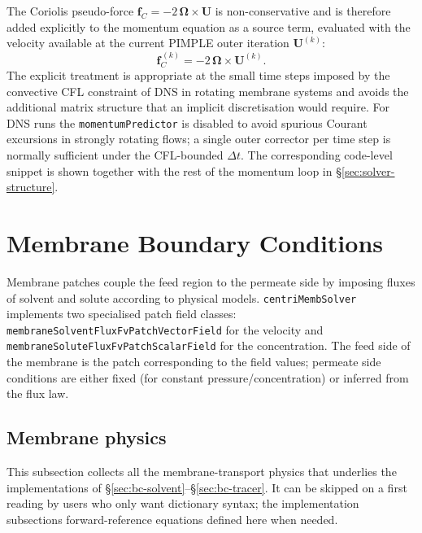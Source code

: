 \documentclass[11pt,a4paper]{article}
\begin{document}
The Coriolis pseudo-force \(\mathbf{f}_{C} = -2\,\boldsymbol{\Omega}\times\mathbf{U}\)
is non-conservative and is therefore added explicitly to the momentum
equation as a source term, evaluated with the velocity available at
the current PIMPLE outer iteration
\(\mathbf{U}^{(k)}\):
\begin{equation}
	\mathbf{f}_{C}^{\,(k)} = -2\,\boldsymbol{\Omega}\times\mathbf{U}^{(k)} .
	\label{eq:coriolis-explicit}
\end{equation}
The explicit treatment is appropriate at the small time steps imposed
by the convective CFL constraint of DNS in rotating membrane systems
and avoids the additional matrix structure that an implicit
discretisation would require. For DNS runs the
\texttt{momentumPredictor} is disabled to avoid spurious Courant
excursions in strongly rotating flows; a single outer corrector per
time step is normally sufficient under the CFL-bounded \(\Delta t\).
The corresponding code-level snippet is shown together with the rest
of the momentum loop in \S\ref{sec:solver-structure}.

\section{Membrane Boundary Conditions}

Membrane patches couple the feed region to the permeate side by
imposing fluxes of solvent and solute according to physical models.
\texttt{centriMembSolver} implements two specialised patch field
classes: \texttt{membraneSolventFluxFvPatchVectorField} for the
velocity and \texttt{membraneSoluteFluxFvPatchScalarField} for the
concentration.  The feed side of the membrane is the patch
corresponding to the field values; permeate side conditions are
either fixed (for constant pressure/concentration) or inferred from
the flux law.

\subsection{Membrane physics}
\label{sec:bc-theory}

This subsection collects all the membrane-transport physics that
underlies the implementations of \S\ref{sec:bc-solvent}--\S\ref{sec:bc-tracer}.
It can be skipped on a first reading by users who only want dictionary
syntax; the implementation subsections forward-reference equations
defined here when needed.
\end{document}
